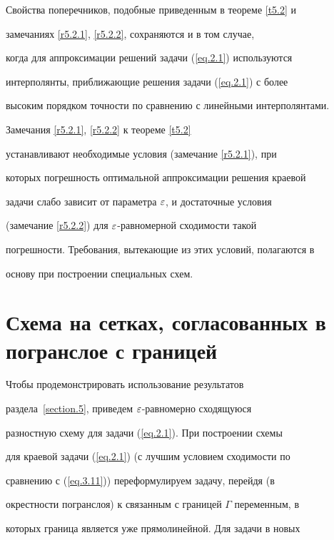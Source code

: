 Свойства поперечников, подобные приведенным в теореме \ref{t5.2} и


замечаниях \ref{r5.2.1}, \ref{r5.2.2}, сохраняются и в том случае,


когда для аппроксимации решений задачи (\ref{eq.2.1}) используются


интерполянты, приближающие решения задачи (\ref{eq.2.1}) с более


высоким порядком точности по сравнению с линейными интерполянтами.





Замечания \ref{r5.2.1}, \ref{r5.2.2} к теореме \ref{t5.2}


устанавливают необходимые условия (замечание \ref{r5.2.1}), при


которых погрешность оптимальной аппроксимации решения краевой


задачи слабо зависит от параметра $\varepsilon$, и достаточные условия


(замечание \ref{r5.2.2}) для $\varepsilon$-равномерной сходимости такой


погрешности. Требования, вытекающие из этих условий, полагаются в


основу при построении специальных схем.








\section{Схема на сетках, согласованных в погранслое с границей}


\label{section.6}





Чтобы продемонстрировать использование результатов


раздела~\ref{section.5}, приведем $\varepsilon$-равномерно сходящуюся


разностную схему для задачи (\ref{eq.2.1}). При построении схемы


для краевой задачи (\ref{eq.2.1}) (с лучшим условием сходимости по


сравнению с (\ref{eq.3.11})) переформулируем задачу, перейдя (в


окрестности погранслоя) к связанным с границей $\varGamma$ переменным, в


которых граница является уже прямолинейной. Для задачи в новых



